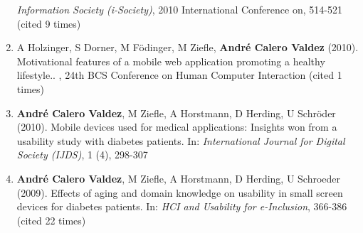 \documentclass[11pt,a4paper,sans]{moderncv}
\begin{document}
\begin{enumerate}
  \emph{Information Society (i-Society)}, 2010 International Conference
  on, 514-521 (cited 9 times)
\item
  A Holzinger, S Dorner, M Födinger, M Ziefle, \textbf{André Calero
  Valdez} (2010). Motivational features of a mobile web application
  promoting a healthy lifestyle.. , 24th BCS Conference on Human
  Computer Interaction (cited 1 times)
\item
  \textbf{André Calero Valdez}, M Ziefle, A Horstmann, D Herding, U
  Schröder (2010). Mobile devices used for medical applications:
  Insights won from a usability study with diabetes patients. In:
  \emph{International Journal for Digital Society (IJDS)}, 1 (4),
  298-307
\item
  \textbf{André Calero Valdez}, M Ziefle, A Horstmann, D Herding, U
  Schroeder (2009). Effects of aging and domain knowledge on usability
  in small screen devices for diabetes patients. In: \emph{HCI and
  Usability for e-Inclusion}, 366-386 (cited 22 times)
\end{enumerate}
\end{document}

